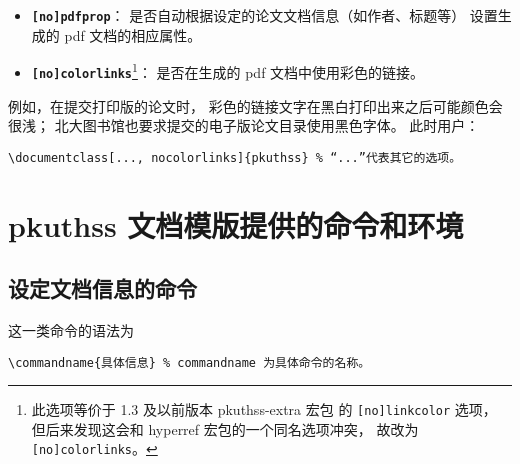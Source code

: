 \begin{itemize}
			\item \textbf{\texttt{[no]pdfprop}}：
				是否自动根据设定的论文文档信息（如作者、标题等）
				设置生成的 pdf 文档的相应属性。%

			\item \textbf{\texttt{[no]colorlinks}}\footnote{%
					此选项等价于 1.3 及以前版本 pkuthss-extra 宏包%
					的 \texttt{[no]linkcolor} 选项，
					但后来发现这会和 hyperref 宏包的一个同名选项冲突，
					故改为 \texttt{[no]colorlinks}。%
				}：
				是否在生成的 pdf 文档中使用彩色的链接。
		\end{itemize}

		例如，在提交打印版的论文时，
		彩色的链接文字在黑白打印出来之后可能颜色会很浅；
		北大图书馆也要求提交的电子版论文目录使用黑色字体。
		此时用户：
\begin{Verbatim}[frame = single]
\documentclass[..., nocolorlinks]{pkuthss} % “...”代表其它的选项。
\end{Verbatim}

	\section{pkuthss 文档模版提供的命令和环境}
		\subsection{设定文档信息的命令}

		这一类命令的语法为
\begin{Verbatim}[frame = single]
\commandname{具体信息} % commandname 为具体命令的名称。
\end{Verbatim}

